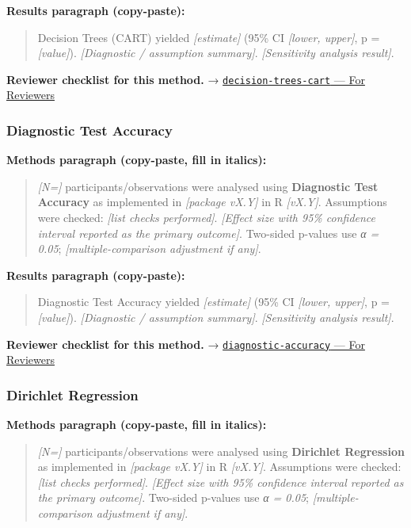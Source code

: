 \documentclass[
]{article}
\begin{document}
\textbf{Results paragraph (copy-paste):}

\begin{quote}
Decision Trees (CART) yielded \emph{{[}estimate{]}} (95\% CI
\emph{{[}lower, upper{]}}, p = \emph{{[}value{]}}). \emph{{[}Diagnostic
/ assumption summary{]}}. \emph{{[}Sensitivity analysis result{]}}.
\end{quote}

\textbf{Reviewer checklist for this method.} →
\href{../chapters/13-ml/decision-trees-cart.Rmd\#for-reviewers}{\texttt{decision-trees-cart}
--- For Reviewers}

\subsubsection{Diagnostic Test Accuracy}\label{diagnostic-test-accuracy}

\textbf{Methods paragraph (copy-paste, fill in italics):}

\begin{quote}
\emph{{[}N={]}} participants/observations were analysed using
\textbf{Diagnostic Test Accuracy} as implemented in \emph{{[}package
vX.Y{]}} in R \emph{{[}vX.Y{]}}. Assumptions were checked: \emph{{[}list
checks performed{]}}. \emph{{[}Effect size with 95\% confidence interval
reported as the primary outcome{]}}. Two-sided p-values use \emph{α =
0.05}; \emph{{[}multiple-comparison adjustment if any{]}}.
\end{quote}

\textbf{Results paragraph (copy-paste):}

\begin{quote}
Diagnostic Test Accuracy yielded \emph{{[}estimate{]}} (95\% CI
\emph{{[}lower, upper{]}}, p = \emph{{[}value{]}}). \emph{{[}Diagnostic
/ assumption summary{]}}. \emph{{[}Sensitivity analysis result{]}}.
\end{quote}

\textbf{Reviewer checklist for this method.} →
\href{../chapters/14-clinical/diagnostic-accuracy.Rmd\#for-reviewers}{\texttt{diagnostic-accuracy}
--- For Reviewers}

\subsubsection{Dirichlet Regression}\label{dirichlet-regression}

\textbf{Methods paragraph (copy-paste, fill in italics):}

\begin{quote}
\emph{{[}N={]}} participants/observations were analysed using
\textbf{Dirichlet Regression} as implemented in \emph{{[}package
vX.Y{]}} in R \emph{{[}vX.Y{]}}. Assumptions were checked: \emph{{[}list
checks performed{]}}. \emph{{[}Effect size with 95\% confidence interval
reported as the primary outcome{]}}. Two-sided p-values use \emph{α =
0.05}; \emph{{[}multiple-comparison adjustment if any{]}}.
\end{quote}
\end{document}
